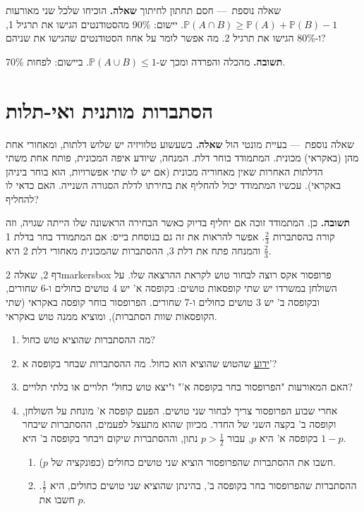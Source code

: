 \documentclass[11pt,a4paper]{report}
\newcommand{\PP}{\mathbb{P}}
\newcommand{\dash}{{\rmfamily —}}
\begin{document}
\begin{suggestion}{שאלה נוספת~\dash{} חסם תחתון לחיתוך}
\textbf{שאלה.} הוכיחו שלכל שני מאורעות $\PP(A\cap B)\ge\PP(A)+\PP(B)-1$.
יישום: 90\% מהסטודנטים הגישו את תרגיל 1, ו-80\% הגישו את תרגיל 2. מה אפשר לומר על אחוז הסטודנטים שהגישו את שניהם?

\textbf{תשובה.} מהכלה והפרדה ומכך ש-$\PP(A\cup B)\le1$. ביישום: לפחות 70\%.
\end{suggestion}

\chapter{הסתברות מותנית ואי-תלות}
\begin{suggestion}{שאלה נוספת~\dash{} בעיית מונטי הול}
\textbf{שאלה.} בשעשוע טלוויזיה יש שלוש דלתות, ומאחורי אחת מהן (באקראי) מכונית. המתמודד בוחר דלת. המנחה, שיודע איפה המכונית, פותח אחת משתי הדלתות האחרות שאין מאחוריה מכונית (אם יש לו שתי אפשרויות, הוא בוחר ביניהן באקראי). עכשיו המתמודד יכול להחליף את בחירתו לדלת הסגורה השנייה. האם כדאי לו להחליף?

\textbf{תשובה.} כן. המתמודד זוכה אם יחליף בדיוק כאשר הבחירה הראשונה שלו הייתה שגויה, וזה קורה בהסתברות $\frac23$. אפשר להראות את זה גם בנוסחת בייס: אם המתמודד בחר בדלת 1 והמנחה פתח את דלת 3, ההסתברות שהמכונית מאחורי דלת 2 היא $\frac23$.
\end{suggestion}


\begin{exercise}{דף 2, שאלה 2}{markersbox}
פרופסור אקס רוצה לבחור טוש לקראת ההרצאה שלו. על השולחן במשרדו יש שתי קופסאות טושים: בקופסה א' יש 4 טושים כחולים ו-6 שחורים, ובקופסה ב' יש 3 טושים כחולים ו-7 שחורים. הפרופסור בוחר קופסה באקראי (שתי הקופסאות שוות הסתברות), ומוציא ממנה טוש באקראי.
\begin{enumerate}[label=(\alph*)]
  \item מה ההסתברות שהוציא טוש כחול?
  \item \underline{ידוע} שהטוש שהוציא הוא כחול. מה ההסתברות שבחר בקופסה א'?
  \item האם המאורעות "הפרופסור בחר בקופסה א'" ו"יצא טוש כחול" תלויים או בלתי תלויים?
  \item אחרי שבוע הפרופסור צריך לבחור שני טושים. הפעם קופסה א' מונחת על השולחן, וקופסה ב' בקצה השני של החדר. מכיוון שהוא מתעצל לפעמים, ההסתברות שיבחר בקופסה א' היא $p$, עבור $p>\frac12$ נתון, וההסתברות שיקום ויבחר בקופסה ב' היא $1-p$.
  \begin{enumerate}[label=(\arabic*)]
    \item חשבו את ההסתברות שהפרופסור הוציא שני טושים כחולים (כפונקציה של $p$).
    \item ההסתברות שהפרופסור בחר בקופסה ב', בהינתן שהוציא שני טושים כחולים, היא $\frac17$. חשבו את $p$.
  \end{enumerate}
\end{enumerate}
\end{exercise}
\end{document}
